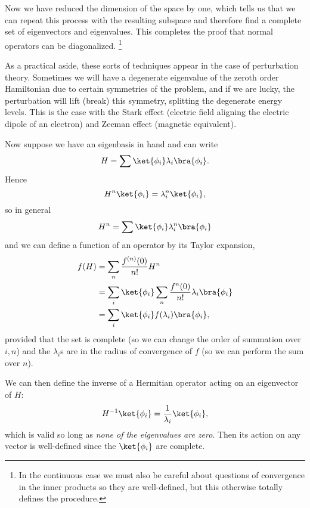 Now we have reduced the dimension of the space by one, which tells us that we can repeat this process with the resulting subspace and therefore find a complete set of eigenvectors and eigenvalues. This completes the proof that normal operators can be diagonalized.%
    \footnote{In the continuous case we must also be careful about questions of convergence in the inner products so they are well-defined, but this otherwise totally defines the procedure.}
    
As a practical aside, these sorts of techniques appear in the case of perturbation theory. Sometimes we will have a degenerate eigenvalue of the zeroth order Hamiltonian due to certain symmetries of the problem, and if we are lucky, the perturbation will lift (break) this symmetry, splitting the degenerate energy levels. This is the case with the Stark effect (electric field aligning the electric dipole of an electron) and Zeeman effect (magnetic equivalent).

Now suppose we have an eigenbasis in hand and can write
\begin{equation}
    H=\sum\ket{\phi_i} \lambda_i \bra{\phi_i}.
\end{equation}
Hence
\begin{equation}
    H^n \ket{\phi_i} = \lambda_i^n \ket{\phi_i},
\end{equation}
so in general
\begin{equation}
    H^n =\sum \ket{\phi_i} \lambda_i^n \bra{\phi_i}
\end{equation}
and we can define a function of an operator by its Taylor expansion,
\begin{align}
    f(H) &= \sum_n \frac{f^{(n)}(0)}{n!}H^n\\
    &= \sum_i \ket{\phi_i} \sum_n \frac{f^n(0)}{n!} \lambda_i \bra{\phi_i}\\
    &= \sum_i \ket{\phi_i} f(\lambda_i) \bra{\phi_i},
\end{align}
provided that the set is complete (so we can change the order of summation over $i,n$) and the $\lambda_i$s are in the radius of convergence of $f$ (so we can perform the sum over $n$).

We can then define the inverse of a Hermitian operator acting on an eigenvector of $H$:
\begin{equation}
    H^{-1} \ket{\phi_i} = \frac{1}{\lambda_i} \ket{\phi_i},
\end{equation}
which is valid so long as \emph{none of the eigenvalues are zero}. Then its action on any vector is well-defined since the $\ket{\phi_i}$ are complete.


